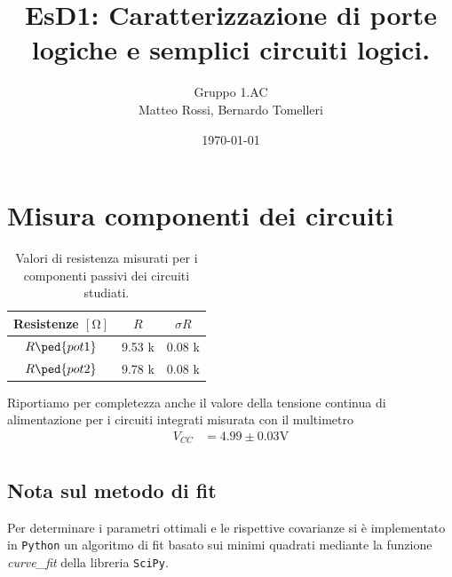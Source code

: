 \documentclass[10pt, a4paper, italian]{article}
\author{Gruppo 1.AC \\ Matteo Rossi, Bernardo Tomelleri}
\title{EsD1: Caratterizzazione di porte logiche e semplici circuiti logici.}
\begin{document}
\date{\today}
\maketitle

\section*{Misura componenti dei circuiti}
\begin{table}[htbp]
\centering
\begin{tabular}{ccc}
\toprule
Resistenze $[\si{\ohm}]$ & $R$ & $\sigma R$ \\
\midrule
\midrule
$R\ped{pot1}$	& 9.53 k	& 0.08 k 		\\
$R\ped{pot2}$	& 9.78 k	& 0.08 k 		\\

\bottomrule     
\end{tabular}
\caption{Valori di resistenza misurati per i componenti passivi dei circuiti
studiati. \label{tab: rmesM}}
\end{table}

Riportiamo per completezza anche il valore della tensione continua di
alimentazione per i circuiti integrati misurata con il multimetro
\begin{align*}
V_{CC} &= 4.99 \pm 0.03 \si{\V} \\
\end{align*}

\subsection*{Nota sul metodo di fit}
Per determinare i parametri ottimali e le rispettive covarianze si \`e
implementato in \verb+Python+ un algoritmo di fit basato sui minimi quadrati
mediante la funzione \emph{curve\_fit} della libreria \texttt{SciPy}.

\setcounter{section}{0}
\end{document}

